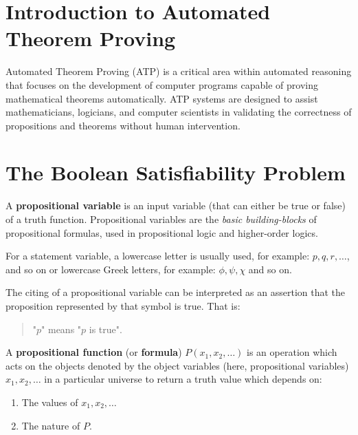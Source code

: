 \iffalse
\section{Introduction to Automated Theorem Proving}
Automated Theorem Proving (ATP) is a critical area within automated reasoning that focuses on the development of computer programs capable of proving mathematical theorems automatically. ATP systems are designed to assist mathematicians, logicians, and computer scientists in validating the correctness of propositions and theorems without human intervention.

\section{The Boolean Satisfiability Problem}
\begin{tcolorbox}[colframe=defcolor,title={\color{white}\bf Propositional Variable}]
\begin{definition}
A \textbf{propositional variable} is an input variable (that can either be true or false) of a truth function. Propositional variables are the \textit{basic building-blocks} of propositional formulas, used in propositional logic and higher-order logics.
\end{definition}
\end{tcolorbox}
\begin{example}
For a statement variable, a lowercase letter is usually used, for example:
$p,q,r,\dots$, and so on
or lowercase Greek letters, for example:
$\phi, \psi, \chi$ and so on.
\end{example}
\begin{remark}
The citing of a propositional variable can be interpreted as an assertion that the proposition represented by that symbol is true.
That is:
\begin{quote}
"$p$" means "$p$ is true".
\end{quote}
\end{remark}

\begin{tcolorbox}[colframe=defcolor,title={\color{white}\bf Propositional Function (Formula)}]
\begin{definition}
A \textbf{propositional function} (or \textbf{formula}) $P(x_1,x_2,\dots)$
is an operation which acts on the objects denoted by the object variables (here, propositional variables) $x_1,x_2,\dots$
in a particular universe to return a truth value which depends on:
\begin{enumerate}[(1)]
	\item The values of $x_1,x_2,\dots$
	\item The nature of $P$.
\end{enumerate}
\end{definition}
\end{tcolorbox}

